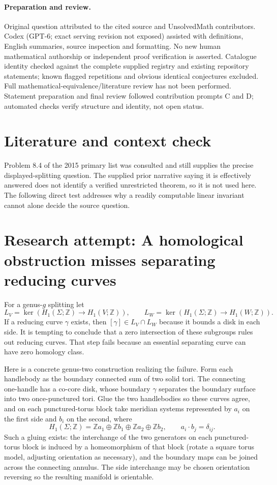 \documentclass[11pt]{article}
\begin{document}
\paragraph{Preparation and review.}
Original question attributed to the cited source and UnsolvedMath contributors. Codex (GPT-6; exact serving revision not exposed) assisted with definitions, English summaries, source inspection and formatting. No new human mathematical authorship or independent proof verification is asserted. Catalogue identity checked against the complete supplied registry and existing repository statements; known flagged repetitions and obvious identical conjectures excluded. Full mathematical-equivalence/literature review has not been performed. Statement preparation and final review followed contribution prompts C and D; automated checks verify structure and identity, not open status.
\label{end:statement}

\section{Literature and context check}
Problem 8.4 of the 2015 primary list was consulted and still supplies the
precise displayed-splitting question. The supplied prior narrative saying it is
effectively answered does not identify a verified unrestricted theorem, so it
is not used here. The following direct test addresses why a readily computable
linear invariant cannot alone decide the source question.
\section{Research attempt: A homological obstruction misses separating reducing curves}
For a genus-$g$ splitting let
\[
 L_V=\ker(H_1(\Sigma;\mathbb Z)\to H_1(V;\mathbb Z)),\qquad
 L_W=\ker(H_1(\Sigma;\mathbb Z)\to H_1(W;\mathbb Z)).
\]
If a reducing curve $\gamma$ exists, then $[\gamma]\in L_V\cap L_W$ because
it bounds a disk in each side. It is tempting to conclude that a zero
intersection of these subgroups rules out reducing curves. That step fails
because an essential separating curve can have zero homology class.

Here is a concrete genus-two construction realizing the failure. Form each
handlebody as the boundary connected sum of two solid tori. The connecting
one-handle has a co-core disk, whose boundary $\gamma$ separates the boundary
surface into two once-punctured tori. Glue the two handlebodies so these curves
agree, and on each punctured-torus block take meridian systems represented by
$a_i$ on the first side and $b_i$ on the second, where
\[
 H_1(\Sigma;\mathbb Z)=
 \mathbb Z a_1\oplus\mathbb Z b_1\oplus
 \mathbb Z a_2\oplus\mathbb Z b_2,
 \qquad a_i\cdot b_j=\delta_{ij}.
\]
Such a gluing exists: the interchange of the two generators on each
punctured-torus block is induced by a homeomorphism of that block (rotate a
square torus model, adjusting orientation as necessary), and the boundary maps
can be joined across the connecting annulus. The side interchange may be
chosen orientation reversing so the resulting manifold is orientable.
\end{document}
